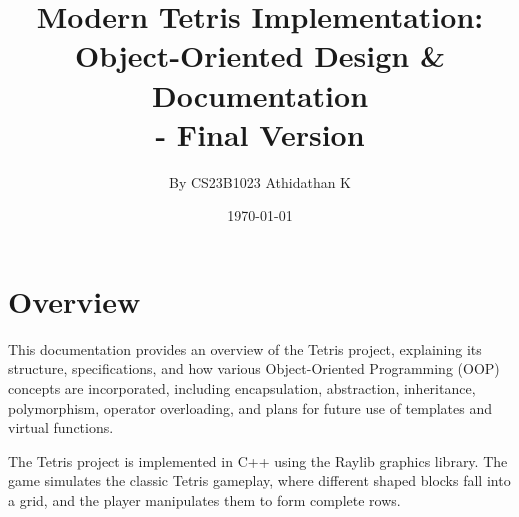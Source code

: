 \documentclass{article}
\begin{document}
\title{\textbf{Modern Tetris Implementation:\\Object-Oriented Design \& Documentation \\ - Final Version }}
\author{By CS23B1023 Athidathan K}
\date{\today}
\maketitle
\tableofcontents
\newpage
\section{Overview}

This documentation provides an overview of the Tetris project, explaining its structure, specifications, and how various Object-Oriented Programming (OOP) concepts are incorporated, including encapsulation, abstraction, inheritance, polymorphism, operator overloading, and plans for future use of templates and virtual functions.

The Tetris project is implemented in C++ using the Raylib graphics library. The game simulates the classic Tetris gameplay, where different shaped blocks fall into a grid, and the player manipulates them to form complete rows.
\end{document}
